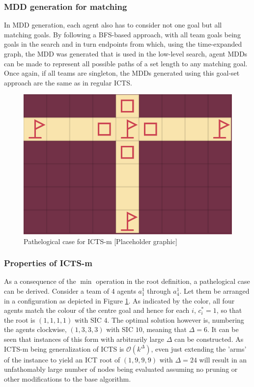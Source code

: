 \documentclass[english]{article}
\begin{document}
	\subsubsection{MDD generation for matching}
	In MDD generation, each agent also has to consider not one goal but all matching goals. By following a BFS-based approach, with all team goals being goals in the search and in turn endpoints from which, using the time-expanded graph, the MDD was generated that is used in the low-level search, agent MDDs can be made to represent all possible paths of a set length to any matching goal. Once again, if all teams are singleton, the MDDs generated using this goal-set approach are the same as in regular ICTS.
	\begin{figure}
	\centering
	\includegraphics[width=\linewidth]{img/path}
	\caption{Pathelogical case for ICTS-m [Placeholder graphic]}
	\label{fig:path}
\end{figure}
	\subsubsection{Properties of ICTS-m}
	As a consequence of the $\min$ operation in the root definition, a pathelogical case can be derived. Consider a team of 4 agents $a_1^1$ through $a_4^1$. Let them be arranged in a configuration as depicted in Figure \ref{fig:path}. As indicated by the color, all four agents match the colour of the centre goal and hence for each $i$, $c^*_i = 1$, so that the root is $(1,1,1,1)$ with SIC $4$. The optimal solution however is, numbering the agents clockwise, $(1,3,3,3)$ with SIC $10$, meaning that $\Delta = 6$. It can be seen that instances of this form with arbitrarily large $\Delta$ can be constructed. As ICTS-m being generalization of ICTS is $\mathcal{O}(k^\Delta)$, even just extending the 'arms' of the instance to yield an ICT root of $(1,9,9,9)$ with $\Delta = 24$ will result in an unfathomably large number of nodes being evaluated assuming no pruning or other modifications to the base algorithm.
	
\end{document}
